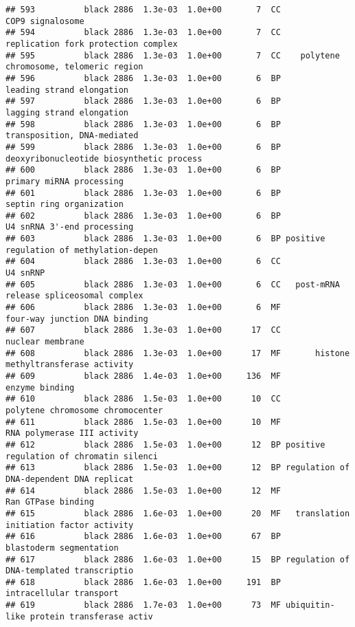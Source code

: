 \documentclass[]{article}
\begin{document}
\begin{verbatim}
## 593          black 2886  1.3e-03  1.0e+00       7  CC                         COP9 signalosome
## 594          black 2886  1.3e-03  1.0e+00       7  CC      replication fork protection complex
## 595          black 2886  1.3e-03  1.0e+00       7  CC    polytene chromosome, telomeric region
## 596          black 2886  1.3e-03  1.0e+00       6  BP                leading strand elongation
## 597          black 2886  1.3e-03  1.0e+00       6  BP                lagging strand elongation
## 598          black 2886  1.3e-03  1.0e+00       6  BP              transposition, DNA-mediated
## 599          black 2886  1.3e-03  1.0e+00       6  BP deoxyribonucleotide biosynthetic process
## 600          black 2886  1.3e-03  1.0e+00       6  BP                 primary miRNA processing
## 601          black 2886  1.3e-03  1.0e+00       6  BP                 septin ring organization
## 602          black 2886  1.3e-03  1.0e+00       6  BP               U4 snRNA 3'-end processing
## 603          black 2886  1.3e-03  1.0e+00       6  BP positive regulation of methylation-depen
## 604          black 2886  1.3e-03  1.0e+00       6  CC                                 U4 snRNP
## 605          black 2886  1.3e-03  1.0e+00       6  CC   post-mRNA release spliceosomal complex
## 606          black 2886  1.3e-03  1.0e+00       6  MF            four-way junction DNA binding
## 607          black 2886  1.3e-03  1.0e+00      17  CC                         nuclear membrane
## 608          black 2886  1.3e-03  1.0e+00      17  MF       histone methyltransferase activity
## 609          black 2886  1.4e-03  1.0e+00     136  MF                           enzyme binding
## 610          black 2886  1.5e-03  1.0e+00      10  CC         polytene chromosome chromocenter
## 611          black 2886  1.5e-03  1.0e+00      10  MF              RNA polymerase III activity
## 612          black 2886  1.5e-03  1.0e+00      12  BP positive regulation of chromatin silenci
## 613          black 2886  1.5e-03  1.0e+00      12  BP regulation of DNA-dependent DNA replicat
## 614          black 2886  1.5e-03  1.0e+00      12  MF                       Ran GTPase binding
## 615          black 2886  1.6e-03  1.0e+00      20  MF   translation initiation factor activity
## 616          black 2886  1.6e-03  1.0e+00      67  BP                  blastoderm segmentation
## 617          black 2886  1.6e-03  1.0e+00      15  BP regulation of DNA-templated transcriptio
## 618          black 2886  1.6e-03  1.0e+00     191  BP                  intracellular transport
## 619          black 2886  1.7e-03  1.0e+00      73  MF ubiquitin-like protein transferase activ

\end{verbatim}
\end{document}
